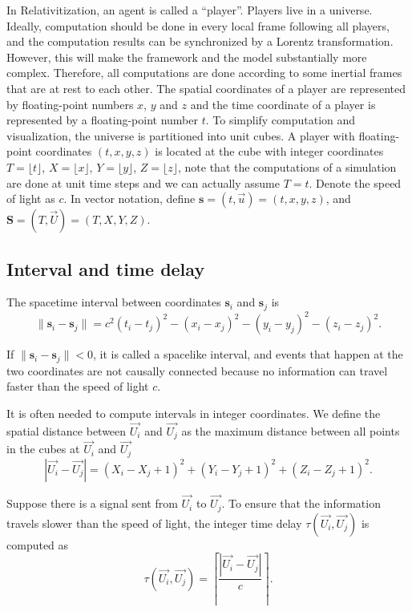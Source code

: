 \documentclass{svproc}
\begin{document}
In Relativitization, an agent is called a ``player''.
Players live in a universe.
Ideally, computation should be done in every local frame following all players, 
and the computation results can be synchronized by a Lorentz transformation.
However, this will make the framework and the model substantially more complex.
Therefore, all computations are done according to some inertial frames that are at rest to each other.
The spatial coordinates of a player are represented by floating-point numbers $x$, $y$ and $z$
and the time coordinate of a player is represented by a floating-point number $t$.
To simplify computation and visualization, the universe is partitioned into unit cubes.
A player with floating-point coordinates $(t, x, y, z)$ is located at the cube 
with integer coordinates $T = \lfloor t \rfloor$, $X = \lfloor x \rfloor$, $Y = \lfloor y \rfloor$, $Z = \lfloor z \rfloor$,
note that the computations of a simulation are done at unit time steps and we can actually assume $T = t$.
Denote the speed of light as $c$.
In vector notation, define $\textbf{s} = (t, \overrightarrow{u}) = (t, x, y, z)$, and 
$\textbf{S} = (T, \overrightarrow{U}) = (T, X, Y, Z)$.

\subsection{Interval and time delay}

The spacetime interval between coordinates $\textbf{s}_i$ and $\textbf{s}_j$ is
\begin{equation}
    \|\textbf{s}_i - \textbf{s}_j\| = c^2 (t_i - t_j)^2 - (x_i - x_j)^2 - (y_i - y_j)^2 - (z_i - z_j)^2.
\end{equation}

If $\|\textbf{s}_i - \textbf{s}_j\| < 0$, it is called a spacelike interval, and events that happen at the two coordinates
are not causally connected because no information can travel faster than the speed of light $c$.

It is often needed to compute intervals in integer coordinates.
We define the spatial distance between $\overrightarrow{U_i}$
and $\overrightarrow{U_j}$ as the maximum distance between all points in the cubes at 
$\overrightarrow{U_i}$ and $\overrightarrow{U_j}$
\begin{equation} \label{eq:delay}
    |\overrightarrow{U_i} - \overrightarrow{U_j}| = (X_i - X_j + 1)^2 + (Y_i - Y_j + 1)^2 + (Z_i - Z_j + 1)^2.
\end{equation}

Suppose there is a signal sent from $\overrightarrow{U_i}$ to $\overrightarrow{U_j}$.
To ensure that the information travels slower than the speed of light, 
the integer time delay $\tau(\overrightarrow{U_i}, \overrightarrow{U_j})$ is computed as
\begin{equation} 
    \tau(\overrightarrow{U_i}, \overrightarrow{U_j}) = \left \lceil \frac{|\overrightarrow{U_i} - \overrightarrow{U_j}|}{c} \right \rceil.
\end{equation}
\end{document}
